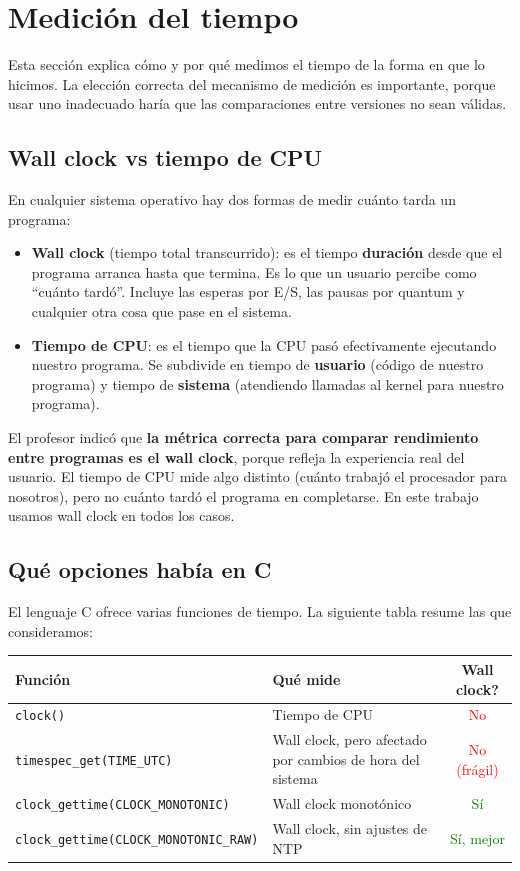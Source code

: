 \section{Medición del tiempo}

Esta sección explica cómo y por qué medimos el tiempo de la forma en que lo hicimos. La elección correcta del mecanismo de medición es importante, porque usar uno inadecuado haría que las comparaciones entre versiones no sean válidas.

\subsection{Wall clock vs tiempo de CPU}

En cualquier sistema operativo hay dos formas de medir cuánto tarda un programa:

\begin{itemize}
    \item \textbf{Wall clock} (tiempo total transcurrido): es el tiempo \textbf{duración} desde que el programa arranca hasta que termina. Es lo que un usuario percibe como ``cuánto tardó''. Incluye las esperas por E/S, las pausas por quantum y cualquier otra cosa que pase en el sistema.
    \item \textbf{Tiempo de CPU}: es el tiempo que la CPU pasó efectivamente ejecutando nuestro programa. Se subdivide en tiempo de \textbf{usuario} (código de nuestro programa) y tiempo de \textbf{sistema} (atendiendo llamadas al kernel para nuestro programa).
\end{itemize}

El profesor indicó que \textbf{la métrica correcta para comparar rendimiento entre programas es el wall clock}, porque refleja la experiencia real del usuario. El tiempo de CPU mide algo distinto (cuánto trabajó el procesador para nosotros), pero no cuánto tardó el programa en completarse. En este trabajo usamos wall clock en todos los casos.

\subsection{Qué opciones había en C}

El lenguaje C ofrece varias funciones de tiempo. La siguiente tabla resume las que consideramos:

\begin{center}
\begin{tabular}{|l|l|c|}
\hline
\textbf{Función} & \textbf{Qué mide} & \textbf{Wall clock?} \\
\hline
\texttt{clock()} & Tiempo de CPU & \textcolor{red}{No} \\
\texttt{timespec\_get(TIME\_UTC)} & Wall clock, pero afectado por cambios de hora del sistema & \textcolor{red}{No (frágil)} \\
\texttt{clock\_gettime(CLOCK\_MONOTONIC)} & Wall clock monotónico & \textcolor{green}{Sí} \\
\texttt{clock\_gettime(CLOCK\_MONOTONIC\_RAW)} & Wall clock, sin ajustes de NTP & \textcolor{green}{Sí, mejor} \\
\hline
\end{tabular}
\end{center}


